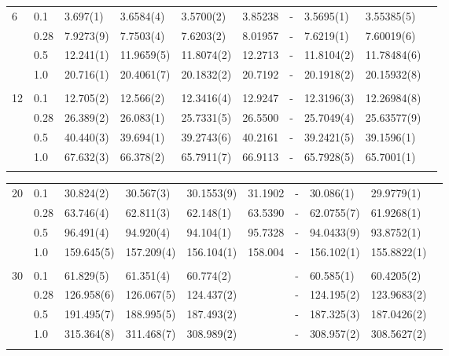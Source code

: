 {\begin{landscape}
\begin{table}
\begin{tabularx}{\hsize}{llR{2.3cm}R{2.3cm}R{2.3cm}R{2.3cm}R{2.3cm}R{2.3cm}R{2.3cm}R{2.2cm}}
		6 & 0.1 & 3.697(1) & 3.6584(4) & 3.5700(2) & 3.85238 & - & 3.5695(1) & 3.55385(5) \\ 
		& 0.28 & 7.9273(9) & 7.7503(4) & 7.6203(2) & 8.01957 & - & 7.6219(1) & 7.60019(6) \\
		& 0.5 & 12.241(1) & 11.9659(5) & 11.8074(2) & 12.2713 & - & 11.8104(2) & 11.78484(6) \\
		& 1.0 & 20.716(1) & 20.4061(7) & 20.1832(2) & 20.7192 & - & 20.1918(2) & 20.15932(8) \\ \hdashline \\
		
		12 & 0.1 & 12.705(2) & 12.566(2) & 12.3416(4) & 12.9247 & - & 12.3196(3) & 12.26984(8) \\ 
		& 0.28 & 26.389(2) & 26.083(1) & 25.7331(5) & 26.5500 & - & 25.7049(4) & 25.63577(9) \\
		& 0.5 & 40.440(3) & 39.694(1) & 39.2743(6) & 40.2161 & - & 39.2421(5) & 39.1596(1) \\
		& 1.0 & 67.632(3) & 66.378(2) & 65.7911(7) & 66.9113 & - & 65.7928(5) & 65.7001(1) \\ \hdashline
	\end{tabularx}
\end{table}

\begin{table}
	\begin{tabularx}{\hsize}{llR{2.3cm}R{2.3cm}R{2.3cm}R{2.3cm}R{2.3cm}R{2.3cm}R{2.3cm}R{2.1cm}} \\
		\label{tab:quantumdotswinteraction2D2}
		20 & 0.1 & 30.824(2) & 30.567(3) & 30.1553(9) & 31.1902 & - & 30.086(1) & 29.9779(1) \\ 
		& 0.28 & 63.746(4) & 62.811(3) & 62.148(1) & 63.5390 & - & 62.0755(7) & 61.9268(1) \\
		& 0.5 & 96.491(4) & 94.920(4) & 94.104(1) & 95.7328 & - & 94.0433(9) & 93.8752(1) \\
		& 1.0 & 159.645(5) & 157.209(4) & 156.104(1) & 158.004 & - & 156.102(1) & 155.8822(1) & \phantom{=} \\ \hdashline \\
		
		30 & 0.1 & 61.829(5) & 61.351(4) & 60.774(2) & & - & 60.585(1) & 60.4205(2) \\ 
		& 0.28 & 126.958(6) & 126.067(5) & 124.437(2) & & - & 124.195(2) & 123.9683(2) \\
		& 0.5 & 191.495(7) & 188.995(5) & 187.493(2) & & - & 187.325(3) & 187.0426(2) \\
		& 1.0 & 315.364(8) & 311.468(7) & 308.989(2) & & - & 308.957(2) & 308.5627(2) \\ \hdashline \\
		

\end{tabularx}
\end{table}
\end{landscape}}
